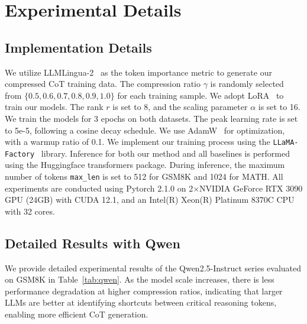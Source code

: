 \section{Experimental Details}
\label{appendix:exp_details}

\subsection{Implementation Details}
\label{appendix:training_details}
We utilize LLMLingua-2~\cite{pan:2024llmlingua2} as the token importance metric to generate our compressed CoT training data. The compression ratio $\gamma$ is randomly selected from $\{0.5, 0.6, 0.7, 0.8, 0.9, 1.0\}$ for each training sample. We adopt LoRA~\cite{lora} to train our models. The rank $r$ is set to 8, and the scaling parameter $\alpha$ is set to 16. We train the models for 3 epochs on both datasets. The peak learning rate is set to 5e-5, following a cosine decay schedule. We use AdamW~\cite{AdamW} for optimization, with a warmup ratio of 0.1. We implement our training process using the \texttt{LLaMA-Factory}~\cite{llamafactory} library. Inference for both our method and all baselines is performed using the Huggingface transformers package. During inference, the maximum number of tokens \texttt{max\_len} is set to 512 for GSM8K and 1024 for MATH. All experiments are conducted using Pytorch 2.1.0 on 2$\times$NVIDIA GeForce RTX 3090 GPU (24GB) with CUDA 12.1, and an Intel(R) Xeon(R) Platinum 8370C CPU with 32 cores.

\subsection{Detailed Results with Qwen}
\label{appendix:qwen_detail}
We provide detailed experimental results of the Qwen2.5-Instruct series evaluated on GSM8K in Table~\ref{tab:qwen}. As the model scale increases, there is less performance degradation at higher compression ratios, indicating that larger LLMs are better at identifying shortcuts between critical reasoning tokens, enabling more efficient CoT generation.

